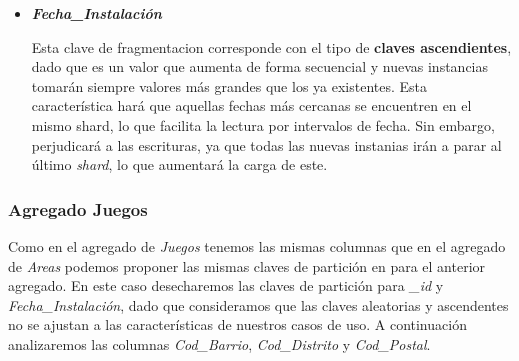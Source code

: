 \documentclass[]{article}
\begin{document}
\begin{itemize}
    \item \textbf{\textit{Fecha\_Instalación}}
    
    Esta clave de fragmentacion corresponde con el tipo de \textbf{claves ascendientes}, dado que es un valor que aumenta de forma secuencial y nuevas instancias tomarán siempre valores más grandes que los ya existentes. Esta característica hará que aquellas fechas más cercanas se encuentren en el mismo shard, lo que facilita la lectura por intervalos de fecha. Sin embargo, perjudicará a las escrituras, ya que todas las nuevas instanias irán a parar al último \textit{shard}, lo que aumentará la carga de este.

    
    
\end{itemize}

\subsubsection{Agregado Juegos}
\label{subsubsec:fragmentacion_juegos}

Como en el agregado de \textit{Juegos} tenemos las mismas columnas que en el agregado de \textit{Areas} podemos proponer las mismas claves de partición en para el anterior agregado. En este caso desecharemos las claves de partición para \textit{\_id} y \textit{Fecha\_Instalación}, dado que consideramos que las claves aleatorias y ascendentes no se ajustan a las características de nuestros casos de uso. A continuación analizaremos las columnas \textit{Cod\_Barrio}, \textit{Cod\_Distrito} y \textit{Cod\_Postal}.
\end{document}
